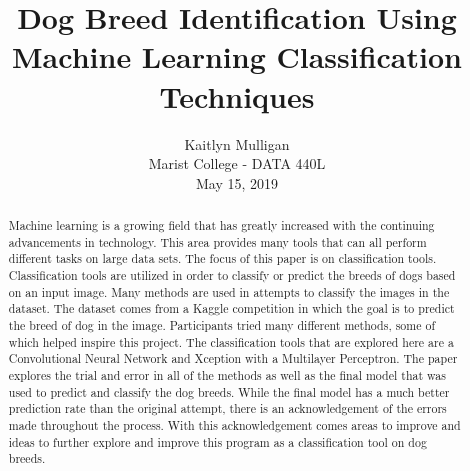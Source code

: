 \documentclass[12pt]{article}
\begin{document}
\lstset{language=Python}
 
\title{\textbf{Dog Breed Identification Using Machine Learning Classification Techniques}}
\date{}

\author{
        Kaitlyn Mulligan\\
        Marist College - DATA 440L \\
        May 15, 2019
 }

\maketitle

\begin{abstract}
    Machine learning is a growing field that has greatly increased with the continuing advancements in technology.  This area provides many tools that can all perform different tasks on large data sets.  The focus of this paper is on classification tools.  Classification tools are utilized in order to classify or predict the breeds of dogs based on an input image.  Many methods are used in attempts to classify the images in the dataset.  The dataset comes from a Kaggle competition in which the goal is to predict the breed of dog in the image.  Participants tried many different methods, some of which helped inspire this project.  The classification tools that are explored here are a Convolutional Neural Network and Xception with a Multilayer Perceptron.  The paper explores the trial and error in all of the methods as well as the final model that was used to predict and classify the dog breeds.  While the final model has a much better prediction rate than the original attempt, there is an acknowledgement of the errors made throughout the process.  With this acknowledgement comes areas to improve and ideas to further explore and improve this program as a classification tool on dog breeds.
\end{abstract} \hspace{10pt}
\thispagestyle{empty}
\clearpage
\setcounter{page}{1}
\end{document}
